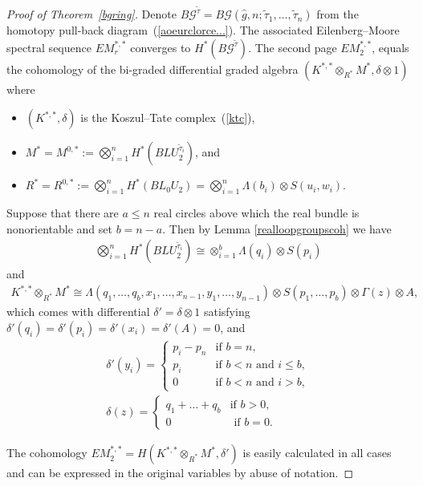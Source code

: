 \documentclass[10pt,a4paper]{amsart}
\numberwithin{equation}{section}
\begin{document}
\begin{proof}[Proof of Theorem~\ref{bgring}]
Denote $B{\mathcal G}^{{\tilde{\tau}}} = B{\mathcal G}(\hat{g}, n; {\tilde{\tau}}_1,\dots,{\tilde{\tau}}_n)$ from the homotopy pull-back diag\-ram~(\ref{aoeurclorce...}). The associated Eilenberg--Moore spectral sequence $EM_r^{*,*}$ converges to $H^*(B{\mathcal G}^{{\tilde{\tau}}})$. The second page $EM_2^{*,*}$, equals the cohomology of the bi-graded dif\/ferential graded algebra $ (K^{*,*} \otimes_{R^*} M^*, \delta \otimes 1) $
where
\begin{itemize}\itemsep=0pt
	\item $(K^{*,*}, \delta)$ is the Koszul--Tate complex~(\ref{ktc}),
	\item $M^* = M^{0,*} := \bigotimes_{i=1}^n H^*(BLU_2^{{\tilde{\tau}}_i})$, and
	\item $R^* = R^{0,*}:= \bigotimes_{i=1}^n H^*(BL_0U_2) = \bigotimes_{i=1}^n \Lambda(b_i) \otimes S(u_i,w_i). $
\end{itemize}
Suppose that there are $a \leq n$ real circles above which the real bundle is nonorientable and set $b = n-a$. Then by Lemma \ref{realloopgroupscoh} we have
\begin{gather*} \bigotimes_{i=1}^n H^*(BLU_2^{{\tilde{\tau}}_i}) \cong \otimes_{i=1}^{b} \Lambda(q_i) \otimes S(p_i)\end{gather*}
and
\begin{gather*} K^{*,*} \otimes_{R^*} M^* \cong \Lambda(q_1,\dots,q_{b}, x_1,\dots,x_{n-1}, y_1,\dots,y_{n-1}) \otimes S(p_1,\dots,p_{b}) \otimes \Gamma(z) \otimes A,
\end{gather*}
which comes with dif\/ferential $\delta' = \delta \otimes 1$ satisfying $\delta'(q_i) = \delta'(p_i) = \delta'(x_i) = \delta'(A) = 0$, and
\begin{gather*}\delta'(y_i) = \begin{cases}
 p_i -p_n & \text{if $b=n$}, \\
 p_i & \text{if $b<n$ and $i\leq b$},\\
 0 & \text{if $b<n$ and $i > b$},
 \end{cases}\\
\delta(z) = \begin{cases} q_1 +\dots+q_{b} & \text{if $b >0$},
\\ 0 & \text{ if $b =0$}. \end{cases}
\end{gather*}

The cohomology $EM_2^{*,*} =H(K^{*,*} \otimes_{R^*} M^*, \delta')$ is easily calculated in all cases and can be expressed in the original variables by abuse of notation.


\end{proof}
\end{document}
